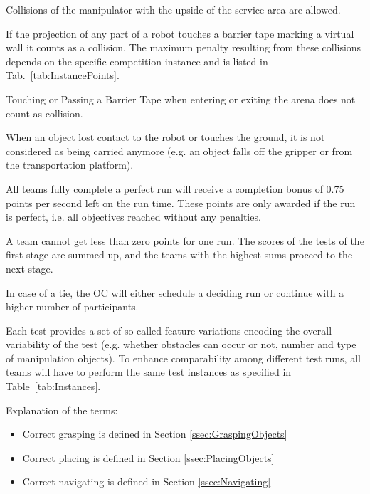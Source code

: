 Collisions of the manipulator with the upside of the service area are allowed.

If the projection of any part of a robot touches a barrier tape marking a virtual wall it counts as a collision. The maximum penalty resulting from these collisions depends on the specific competition instance and is listed in Tab.~\ref{tab:InstancePoints}.

Touching or Passing a Barrier Tape when entering or exiting the arena does not count as collision.
\par
When an object lost contact to the robot or touches the ground, it is not considered as being carried anymore (e.g. an object falls off the gripper or from the transportation platform).
\par
All teams fully complete a perfect run will receive a completion bonus of 0.75 points per second left on the run time. These points are only awarded if the run is perfect, i.e. all objectives reached without any penalties.
\par
A team cannot get less than zero points for one run.
The scores of the tests of the first stage are summed up, and the teams with the highest sums proceed to the next stage.
\par
In case of a tie, the OC will either schedule a deciding run or continue with a higher number of participants.
\par
\par

Each test provides a set of so-called feature variations encoding the overall variability of the test (e.g. whether obstacles can occur or not, number and type of manipulation objects). To enhance comparability among different test runs, all teams will have to perform the same test instances as specified in Table~\ref{tab:Instances}.


Explanation of the terms:
\begin{itemize}
\item Correct grasping is defined in Section \ref{ssec:GraspingObjects}
\item Correct placing is defined in Section \ref{ssec:PlacingObjects}
\item Correct navigating is defined in Section \ref{ssec:Navigating}
\end{itemize}


